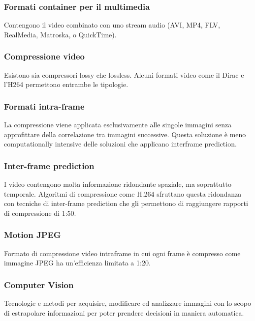 \documentclass[8pt,a4paper]{article}
\begin{document}
\begin{multicols}{5}
    \subsubsection{Formati container per il multimedia}
    Contengono il video combinato con uno stream audio (AVI, MP4, FLV, RealMedia, 
    Matroska, o QuickTime).

    \subsubsection{Compressione video}
    Esistono sia compressori lossy che lossless. Alcuni formati video come il 
    Dirac e l’H264 permettono entrambe le tipologie.

    \subsubsection{Formati intra-frame}
    La compressione viene applicata esclusivamente alle singole immagini senza 
    approfittare della correlazione tra immagini successive. Questa soluzione è meno 
    computationally intensive delle soluzioni che applicano interframe prediction.

    \subsubsection{Inter-frame prediction}
    I video contengono molta informazione ridondante spaziale, ma soprattutto temporale. 
    Algoritmi di compressione come H.264 sfruttano questa ridondanza con tecniche 
    di inter-frame prediction che gli permettono di raggiungere rapporti di compressione 
    di 1:50.

    \subsubsection{Motion JPEG}
    Formato di compressione video intraframe in cui ogni frame è compresso come 
    immagine JPEG ha un’efficienza limitata a 1:20. 

    \subsubsection{Computer Vision}
    Tecnologie e metodi per acquisire, modificare ed analizzare immagini con lo 
    scopo di estrapolare informazioni per poter prendere decisioni in maniera automatica.


\end{multicols}
\end{document}

